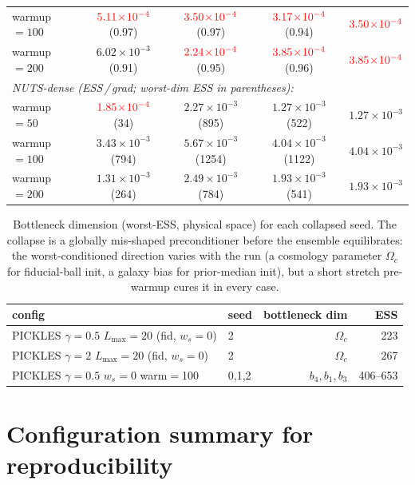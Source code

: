 \documentclass{article}
\begin{document}
\begin{table}[h]
\begin{tabular}{l c c c c}
\quad warmup $=100$ & $\textcolor{red}{5.11\!\times\!10^{-4}}$ (0.97) & $\textcolor{red}{3.50\!\times\!10^{-4}}$ (0.97) & $\textcolor{red}{3.17\!\times\!10^{-4}}$ (0.94) & $\textcolor{red}{3.50\!\times\!10^{-4}}$ \\
\quad warmup $=200$ & $6.02\!\times\!10^{-3}$ (0.91) & $\textcolor{red}{2.24\!\times\!10^{-4}}$ (0.95) & $\textcolor{red}{3.85\!\times\!10^{-4}}$ (0.96) & $\textcolor{red}{3.85\!\times\!10^{-4}}$ \\
\multicolumn{5}{l}{\emph{NUTS-dense (ESS\,/\,grad; worst-dim ESS in parentheses):}} \\
\quad warmup $=50$  & $\textcolor{red}{1.85\!\times\!10^{-4}}$ (34) & $2.27\!\times\!10^{-3}$ (895) & $1.27\!\times\!10^{-3}$ (522) & $1.27\!\times\!10^{-3}$ \\
\quad warmup $=100$ & $3.43\!\times\!10^{-3}$ (794) & $5.67\!\times\!10^{-3}$ (1254) & $4.04\!\times\!10^{-3}$ (1122) & $4.04\!\times\!10^{-3}$ \\
\quad warmup $=200$ & $1.31\!\times\!10^{-3}$ (264) & $2.49\!\times\!10^{-3}$ (784) & $1.93\!\times\!10^{-3}$ (541) & $1.93\!\times\!10^{-3}$ \\
\bottomrule
\end{tabular}
\end{table}

\begin{table}[h]
\centering
\caption{Bottleneck dimension (worst-ESS, physical space) for each
collapsed seed. The collapse is a globally mis-shaped preconditioner
before the ensemble equilibrates: the worst-conditioned direction varies
with the run (a cosmology parameter $\Omega_c$ for fiducial-ball init, a
galaxy bias for prior-median init), but a short stretch pre-warmup cures
it in every case.}
\label{tab:desCollapseDim}
\small
\begin{tabular}{l l r r}
\toprule
config & seed & bottleneck dim & ESS \\
\midrule
PICKLES $\gamma{=}0.5$ $L_{\max}{=}20$ (fid, $w_s{=}0$) & 2 & $\Omega_c$ & 223 \\
PICKLES $\gamma{=}2$ $L_{\max}{=}20$ (fid, $w_s{=}0$)   & 2 & $\Omega_c$ & 267 \\
PICKLES $\gamma{=}0.5$ $w_s{=}0$ warm$=$100 & 0,1,2 & $b_4,b_1,b_3$ & 406--653 \\
\bottomrule
\end{tabular}
\end{table}

\section{Configuration summary for reproducibility}\label{app:desConfig}
\end{document}
